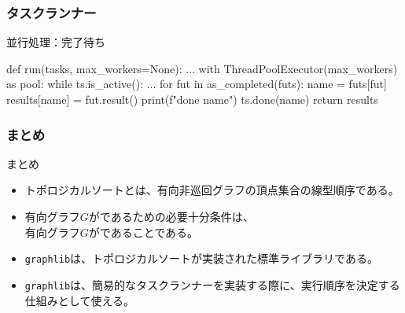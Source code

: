 \documentclass[aspectratio=169,dvipdfmx,12pt,notheorems]{beamer}
\theoremstyle{definition}
\begin{document}
\begin{frame}[fragile]\frametitle{タスクランナー}
\begin{block}{並行処理：完了待ち}
\begin{pyverbatim}
def run(tasks, max_workers=None):
    ...
    with ThreadPoolExecutor(max_workers) as pool:
        while ts.is_active():
            ...
            for fut in as_completed(futs):
                name = futs[fut]
                results[name] = fut.result()
                print(f"done {name}")
                ts.done(name)
    return results
\end{pyverbatim}
\end{block}
\end{frame}

\begin{frame}\frametitle{まとめ}

\begin{block}{まとめ}
\begin{itemize}
\item トポロジカルソートとは、有向非巡回グラフの頂点集合の線型順序である。
\item 有向グラフ$G$がであるための必要十分条件は、\\ 有向グラフ$G$がであることである。
\item \texttt{graphlib}は、トポロジカルソートが実装された標準ライブラリである。
\item \texttt{graphlib}は、簡易的なタスクランナーを実装する際に、実行順序を決定する仕組みとして使える。
\end{itemize}
\end{block}

\end{frame}
\end{document}
